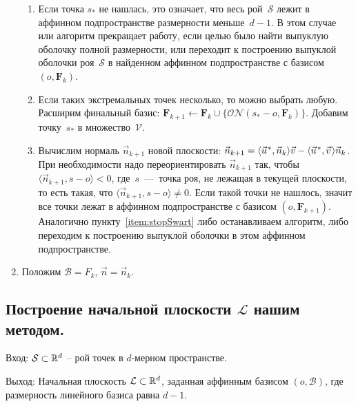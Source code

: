 \documentclass[a4paper,12pt]{article}
\newcommand{\R}[1][]{%
  \ifthenelse{\equal{#1}{}}%
  {\mathbb{R}}%
  {\mathbb{R}^{#1}}}
\newcommand{\Swarm}{\mathcal{S}}              %
\newcommand{\Basis}{\mathcal{B}}              %
\newcommand{\Viewed}{\mathcal{V}}             %
\newcommand{\set}[2][]{#1\{ #2 #1\}}                    %
\newcommand{\scalprod}[3][]{#1\langle #2, #3 #1\rangle} %
\newcommand{\ONorm}[3][]{\mathcal{ON}#1( #2, #3 #1)} %
\newcommand{\FinalVec}{\mathbf{F}} %
\newcommand{\Plane}{\mathcal{L}}           %
\renewcommand{\.}{\hspace{0.2ex}}
\begin{document}
\begin{enumerate}
\begin{enumerate}
        \item Если точка $s_*$ не нашлась, это означает, что весь рой~$\Swarm$ лежит в аффинном подпространстве размерности меньше~$d-1$. В этом случае или алгоритм прекращает работу, если целью было найти выпуклую оболочку полной размерности, или переходит к построению выпуклой оболочки роя~$\Swarm$ в найденном аффинном подпространстве с базисом $(o, \FinalVec_k)$.
        \label{item:stopSwart}

        \item  Если таких экстремальных точек несколько, то можно выбрать любую. Расширим финальный базис: $\FinalVec_{k+1} \leftarrow \FinalVec_k \cup \set[\big]{\ONorm{s_* - o}{\FinalVec_k}}$. Добавим точку~$s_*$ в множество~$\Viewed$.

        \item Вычислим нормаль $\vec n_{k+1}$ новой плоскости: $\vec n_{k+1} = \scalprod{\vec u\.^*}{\vec n_k}\vec v - \scalprod{\vec u\.^*}{\vec v \.}\vec n_k$. При необходимости надо переориентировать $\vec n_{k+1}$ так, чтобы $\scalprod{\vec n_{k+1}}{s - o} < 0$, где~$s$~---~точка роя, не лежащая в текущей плоскости, то есть такая, что $\scalprod{\vec n_{k+1}}{s - o} \neq 0$. Если такой точки не нашлось, значит все точки лежат в аффинном подпространстве с базисом $(o, \FinalVec_{k+1})$. Аналогично пункту~\ref{item:stopSwart} либо останавливаем алгоритм, либо переходим к построению выпуклой оболочки в этом аффинном подпространстве.



      \end{enumerate}
      \item Положим $\Basis = F_k$, $\vec n = \vec n_k$.
    \end{enumerate}

  \subsection{Построение начальной плоскости $\Plane$ нашим методом.}
    \label{subsec:InitialPlaneUs}

    Вход: $\Swarm \subset \R[d]$ -- рой точек в $d$-мерном пространстве.

    Выход: Начальная плоскость $\Plane \subset \R[d]$, заданная аффинным базисом $(o,\Basis)$, где размерность линейного базиса равна $d-1$.
\end{document}
